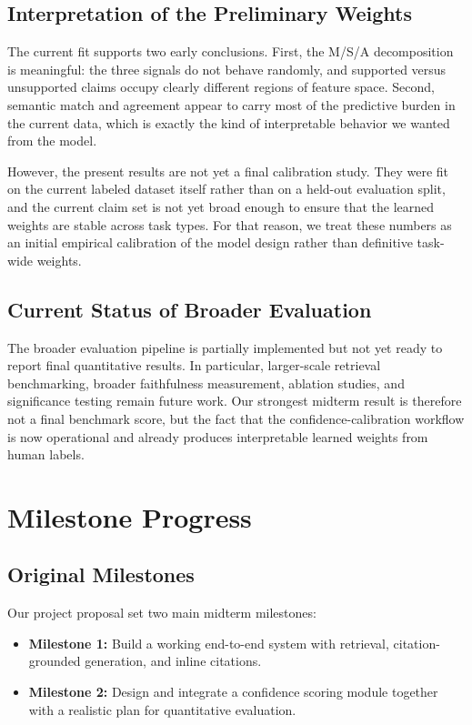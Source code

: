 \documentclass[10pt]{article}
\begin{document}
\subsection{Interpretation of the Preliminary Weights}

The current fit supports two early conclusions. First, the M/S/A
decomposition is meaningful: the three signals do not behave randomly,
and supported versus unsupported claims occupy clearly different
regions of feature space. Second, semantic match and agreement appear
to carry most of the predictive burden in the current data, which is
exactly the kind of interpretable behavior we wanted from the model.

However, the present results are not yet a final calibration study.
They were fit on the current labeled dataset itself rather than on a
held-out evaluation split, and the current claim set is not yet broad
enough to ensure that the learned weights are stable across task types.
For that reason, we treat these numbers as an initial empirical
calibration of the model design rather than definitive task-wide
weights.

\subsection{Current Status of Broader Evaluation}

The broader evaluation pipeline is partially implemented but not yet
ready to report final quantitative results. In particular, larger-scale
retrieval benchmarking, broader faithfulness measurement, ablation
studies, and significance testing remain future work. Our strongest
midterm result is therefore not a final benchmark score, but the fact
that the confidence-calibration workflow is now operational and already
produces interpretable learned weights from human labels.

\section{Milestone Progress}

\subsection{Original Milestones}

Our project proposal set two main midterm milestones:
\begin{itemize}
    \item \textbf{Milestone 1:} Build a working end-to-end system with
    retrieval, citation-grounded generation, and inline citations.
    \item \textbf{Milestone 2:} Design and integrate a confidence
    scoring module together with a realistic plan for quantitative
    evaluation.
\end{itemize}
\end{document}
